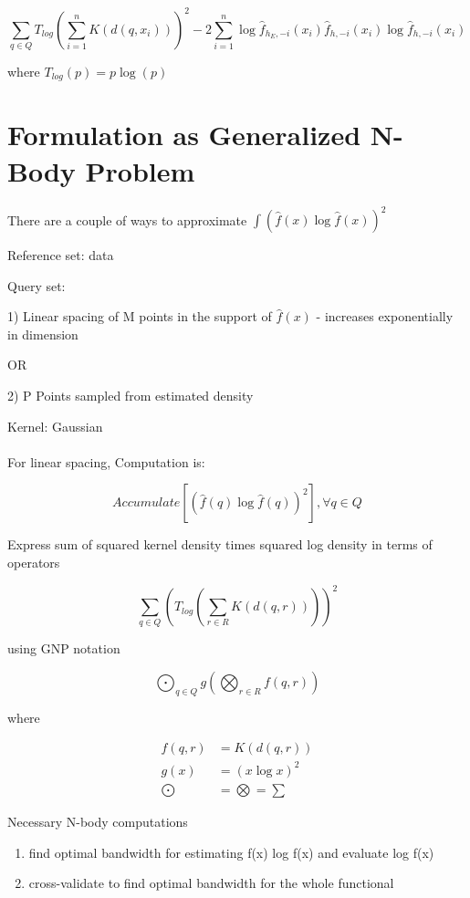 \documentclass{amsart}
\begin{document}
\begin{displaymath}
\sum_{q \in Q} T_{log}(\sum_{i=1}^n K(d(q,x_i)))^2 - 2 \sum_{i=1}^n \log \hat{f}_{h_E,-i}(x_i) \hat{f}_{h,-i}(x_i) \log \hat{f}_{h,-i}(x_i)
\end{displaymath}

where $ T_{log}(p) = p \log(p) $


\section{Formulation as Generalized N-Body Problem}

There are a couple of ways to approximate $ \int (\hat{f}(x) \log \hat{f}(x))^2  $


Reference set: data


Query set:

1) Linear spacing of M points in the support of $ \hat{f}(x) $ - increases exponentially in dimension

OR 

2) P Points sampled from estimated density


Kernel: Gaussian
\\\\
For linear spacing, Computation is:

\begin{displaymath}
Accumulate[(\hat{f}(q) \log \hat{f}(q))^2] , \forall q \in Q 
\end{displaymath}

Express sum of squared kernel density times squared log density in terms of operators

\begin{displaymath}
\sum_{q \in Q} (T_{log}(\sum_{r \in R} K(d(q,r))))^2
\end{displaymath}

using GNP notation

\begin{displaymath}
\bigodot_{q \in Q} g\left(\bigotimes_{r \in R} f(q,r)\right)
\end{displaymath}

where

\begin{align*}
f(q,r) & = K(d(q,r))\\
g(x) & = (x \log x)^2\\
\bigodot & = \bigotimes = \sum
\end{align*}



Necessary N-body computations
\begin{enumerate}
\item find optimal bandwidth for estimating f(x) log f(x) and evaluate log f(x)
\item cross-validate to find optimal bandwidth for the whole functional
\end{enumerate}
\end{document}
